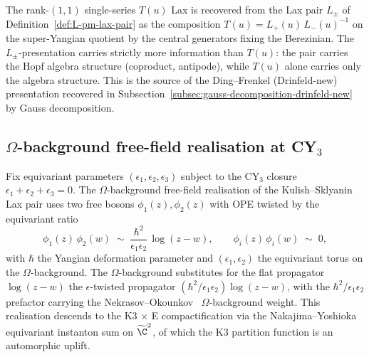\begin{remark}
\label{rem:ks-vs-osp-lax}
The rank-$(1,1)$ single-series $T(u)$ Lax is recovered from the
Lax pair $L_\pm$ of Definition~\ref{def:L-pm-lax-pair} as the
composition $T(u) = L_+(u)\, L_-(u)^{-1}$ on the super-Yangian
quotient by the central generators fixing the Berezinian. The
$L_\pm$-presentation carries strictly more information than $T(u)$:
the pair carries the Hopf algebra structure (coproduct, antipode),
while $T(u)$ alone carries only the algebra structure. This is the
source of the Ding--Frenkel (Drinfeld-new) presentation recovered in
Subsection~\ref{subsec:gauss-decomposition-drinfeld-new} by Gauss
decomposition.
\end{remark}

\subsection{$\Omega$-background free-field realisation at CY$_3$}
\label{subsec:omega-background-free-field}

Fix equivariant parameters $(\epsilon_1, \epsilon_2, \epsilon_3)$
subject to the CY$_3$ closure $\epsilon_1 + \epsilon_2 + \epsilon_3 = 0$.
The $\Omega$-background free-field realisation of the Kulish--Sklyanin
Lax pair uses two free bosons $\phi_1(z), \phi_2(z)$ with OPE twisted
by the equivariant ratio
\begin{equation}\label{eq:omega-background-ope}
 \phi_1(z)\, \phi_2(w)
 \;\sim\; \frac{\hbar^2}{\epsilon_1 \epsilon_2}\, \log(z - w),
 \qquad
 \phi_i(z)\, \phi_i(w) \;\sim\; 0,
\end{equation}
with $\hbar$ the Yangian deformation parameter and
$(\epsilon_1, \epsilon_2)$ the equivariant torus on the
$\Omega$-background. The $\Omega$-background substitutes for the
flat propagator $\log(z - w)$ the $\epsilon$-twisted propagator
$(\hbar^2/\epsilon_1 \epsilon_2) \log(z - w)$, with the
$\hbar^2/\epsilon_1 \epsilon_2$ prefactor carrying the
Nekrasov--Okounkov~\cite{NekrasovOkounkov2003} $\Omega$-background
weight. This realisation descends to the K3 $\times$ E compactification
via the Nakajima--Yoshioka~\cite{NakajimaYoshioka2003a,NakajimaYoshioka2003b}
equivariant instanton sum on $\widetilde{\C}^2$, of which the K3
partition function is an automorphic uplift.

